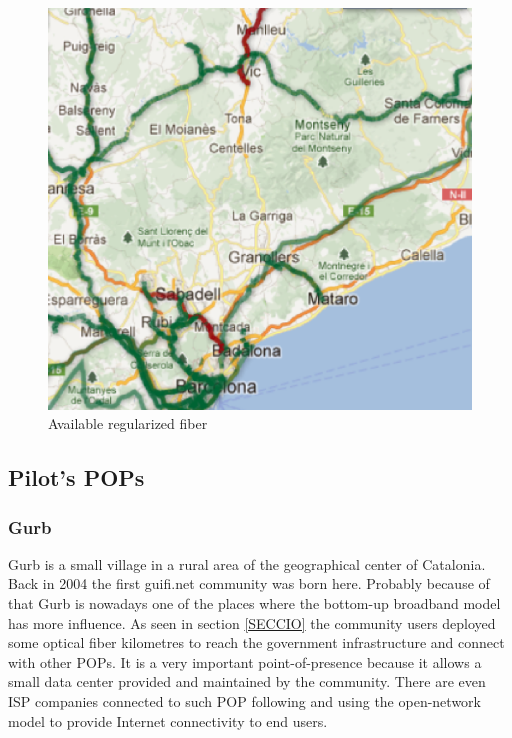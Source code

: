 \begin{figure}[htbp]
  \centering
  \includegraphics[scale=.5]{sect3/figures/xoc_map.eps} 
  \caption{Available regularized fiber}
  \label{fig:xoc_map}
\end{figure}



\subsection{Pilot's POPs}

\subsubsection{Gurb}

Gurb is a small village in a rural area of the geographical center of Catalonia. Back in 2004 the first guifi.net community
was born here. Probably because of that Gurb is nowadays one of the places where the bottom-up broadband model has more
influence. As seen in section \ref{SECCIO} the community users deployed some optical fiber kilometres to reach the government
infrastructure and connect with other POPs.
\medskip
It is a very important point-of-presence because it allows a small data center provided and maintained by the community.
There are even ISP companies connected to such POP following and using the open-network model to provide Internet
connectivity to end users.


